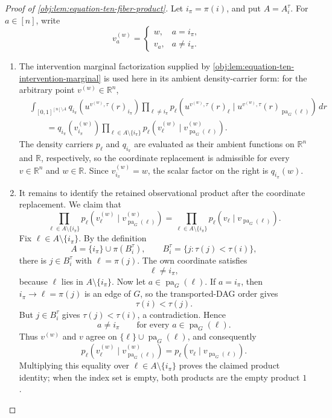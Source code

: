\begin{proof}[Proof of \cref{obj:lem:equation-ten-fiber-product}]
Let \(i_\pi=\pi(i)\), and put \(A=A_i^\tau\).  For \(a\in[n]\), write
\[
v^{(w)}_a=
\begin{cases}
w, & a=i_\pi,\\
v_a, & a\ne i_\pi .
\end{cases}
\]

\begin{enumerate}
\item The intervention marginal factorization supplied by \cref{obj:lem:equation-ten-intervention-marginal} is used here in its ambient density-carrier form: for the arbitrary point \(v^{(w)}\in\mathbb R^n\),
\[
\begin{aligned}
&\int_{[0,1]^{[n]\setminus A}}
q_{i_\pi}\!\left(u^{v^{(w)},\tau}(r)_{i_\pi}\right)
\prod_{\ell\ne i_\pi}
p_\ell\!\left(u^{v^{(w)},\tau}(r)_\ell\mid
u^{v^{(w)},\tau}(r)_{\operatorname{pa}_G(\ell)}\right)\,dr  \\
&\qquad =
q_{i_\pi}\!\left(v^{(w)}_{i_\pi}\right)
\prod_{\ell\in A\setminus\{i_\pi\}}
p_\ell\!\left(v^{(w)}_\ell\mid
v^{(w)}_{\operatorname{pa}_G(\ell)}\right).
\end{aligned}
\]
The density carriers \(p_\ell\) and \(q_{i_\pi}\) are evaluated as their ambient functions on \(\mathbb R^n\) and \(\mathbb R\), respectively, so the coordinate replacement is admissible for every \(v\in\mathbb R^n\) and \(w\in\mathbb R\).  Since \(v^{(w)}_{i_\pi}=w\), the scalar factor on the right is \(q_{i_\pi}(w)\). %

\item It remains to identify the retained observational product after the coordinate replacement.  We claim that
\[
\prod_{\ell\in A\setminus\{i_\pi\}}
p_\ell\!\left(v^{(w)}_\ell\mid
v^{(w)}_{\operatorname{pa}_G(\ell)}\right)
=
\prod_{\ell\in A\setminus\{i_\pi\}}
p_\ell\!\left(v_\ell\mid v_{\operatorname{pa}_G(\ell)}\right).
\]
Fix \(\ell\in A\setminus\{i_\pi\}\).  By the definition
\[
A=\{i_\pi\}\cup \pi(B_i^\tau),
\qquad
B_i^\tau=\{j:\tau(j)<\tau(i)\},
\]
there is \(j\in B_i^\tau\) with \(\ell=\pi(j)\).  The own coordinate satisfies
\[
\ell\ne i_\pi,
\]
because \(\ell\) lies in \(A\setminus\{i_\pi\}\).  Now let \(a\in\operatorname{pa}_G(\ell)\).  If \(a=i_\pi\), then \(i_\pi\to \ell=\pi(j)\) is an edge of \(G\), so the transported-DAG order gives
\[
\tau(i)<\tau(j).
\]
But \(j\in B_i^\tau\) gives \(\tau(j)<\tau(i)\), a contradiction.  Hence
\[
a\ne i_\pi
\qquad\text{for every }a\in\operatorname{pa}_G(\ell).
\]
Thus \(v^{(w)}\) and \(v\) agree on \(\{\ell\}\cup\operatorname{pa}_G(\ell)\), and consequently
\[
p_\ell\!\left(v^{(w)}_\ell\mid
v^{(w)}_{\operatorname{pa}_G(\ell)}\right)
=
p_\ell\!\left(v_\ell\mid v_{\operatorname{pa}_G(\ell)}\right).
\]
Multiplying this equality over \(\ell\in A\setminus\{i_\pi\}\) proves the claimed product identity; when the index set is empty, both products are the empty product \(1\). %


\end{enumerate}
\end{proof}

